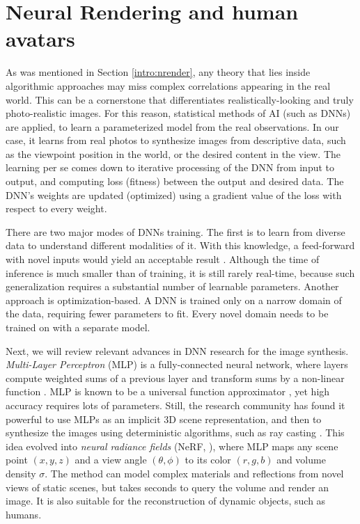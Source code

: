 \section{Neural Rendering and human avatars}\label{lit:nrender}

As was mentioned in Section \ref{intro:nrender}, any theory that lies inside algorithmic approaches may miss complex correlations appearing in the real world. This can be a cornerstone that differentiates realistically-looking and truly photo-realistic images. For this reason, statistical methods of AI (such as DNNs) are applied, to learn a parameterized model from the real observations. In our case, it learns from real photos to synthesize images from descriptive data, such as the viewpoint position in the world, or the desired content in the view. The learning per se comes down to iterative processing of the DNN from input to output, and computing loss (fitness) between the output and desired data. The DNN's weights are updated (optimized) using a gradient value of the loss with respect to every weight.

There are two major modes of DNNs training. The first is to learn from diverse data to understand different modalities of it. With this knowledge, a feed-forward with novel inputs would yield an acceptable result \cite{dnn:gan14, dnn:gaugan19, dnn:stylegan-v1-19}. Although the time of inference is much smaller than of training, it is still rarely real-time, because such generalization requires a substantial number of learnable parameters. Another approach is optimization-based. A DNN is trained only on a narrow domain of the data, requiring fewer parameters to fit. Every novel domain needs to be trained on with a separate model. 

Next, we will review relevant advances in DNN research for the image synthesis. \textit{Multi-Layer Perceptron} (MLP) is a fully-connected neural network, where layers compute weighted sums of a previous layer and transform sums by a non-linear function \cite{aux:activation18}. MLP is known to be a universal function approximator \cite{dnn:mlp89}, yet high accuracy requires lots of parameters. Still, the research community has found it powerful to use MLPs as an implicit 3D scene representation, and then to synthesize the images using deterministic algorithms, such as ray casting \cite{dnn:scene-repr19}. This idea evolved into \textit{neural radiance fields} (NeRF, \cite{dnn:nerf20}), where MLP maps any scene point $(x, y, z)$ and a view angle $(\theta, \phi)$ to its color $(r, g, b)$ and volume density $\sigma$. The method can model complex materials and reflections from novel views of static scenes, but takes seconds to query the volume and render an image. It is also suitable for the reconstruction of dynamic objects, such as humans\cite{dnn:phorhum22}.

